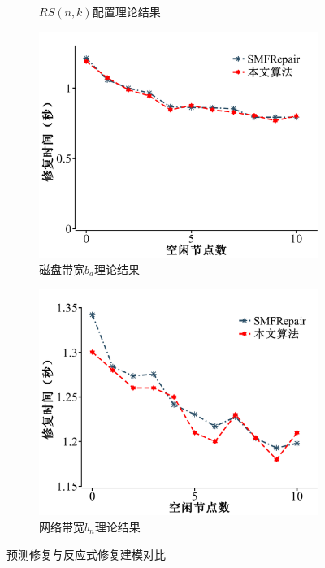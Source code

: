 \begin{figure}[htbp]
\begin{subfigure}[t]{0.4\textwidth}
		\caption{$RS(n,k)$配置理论结果}
		\label{fig:3-16}
	\end{subfigure}
	\begin{subfigure}[t]{0.4\textwidth}
		\centering
		\includegraphics[width=1\linewidth]{figures/3-17.pdf}
		\caption{磁盘带宽$b_d$理论结果}
		\label{fig:3-17}
	\end{subfigure}
	\begin{subfigure}[t]{0.4\textwidth}
		\centering
		\includegraphics[width=1\linewidth]{figures/3-18.pdf}
		\caption{网络带宽$b_n$理论结果}
		\label{fig:3-18}
	\end{subfigure}
	\caption{预测修复与反应式修复建模对比}
	\label{fig:3-15-18}
\end{figure}




